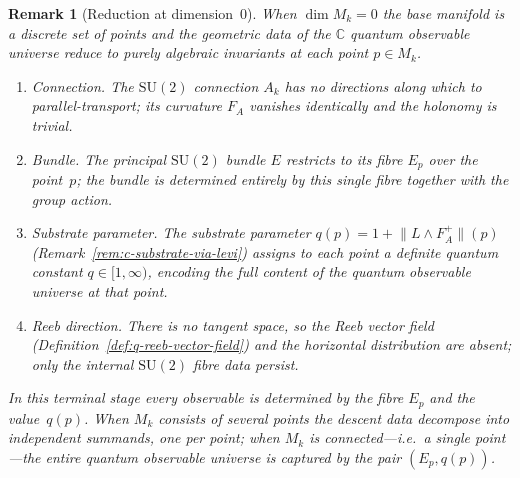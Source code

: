 \documentclass[12pt,a4paper]{report}
\newtheorem{remark}[theorem]{Remark}
\begin{document}
\begin{remark}[Reduction at dimension~$0$]
\label{rem:descent-reduction-zero}
When $\dim M_k = 0$ the base manifold is a discrete set of points and
the geometric data of the $\mathbb{C}$ quantum observable universe
reduce to purely algebraic invariants at each point $p\in M_k$.
\begin{enumerate}
  \item \emph{Connection.}  The $\mathrm{SU}(2)$ connection $A_k$ has no
        directions along which to parallel-transport; its curvature
        $F_A$ vanishes identically and the holonomy is trivial.
  \item \emph{Bundle.}  The principal $\mathrm{SU}(2)$ bundle $E$
        restricts to its fibre $E_p$ over the point~$p$; the bundle
        is determined entirely by this single fibre together with
        the group action.
  \item \emph{Substrate parameter.}  The substrate parameter
        $q(p) = 1 + \lVert L\wedge F_A^{+}\rVert(p)$
        (Remark~\ref{rem:c-substrate-via-levi}) assigns to each point a
        definite quantum constant $q\in[1,\infty)$, encoding the full
        content of the quantum observable universe at that point.
  \item \emph{Reeb direction.}  There is no tangent space, so the Reeb
        vector field (Definition~\ref{def:q-reeb-vector-field}) and the
        horizontal distribution are absent; only the internal
        $\mathrm{SU}(2)$ fibre data persist.
\end{enumerate}
In this terminal stage every observable is determined by the fibre
$E_p$ and the value~$q(p)$.  When $M_k$ consists of several points the
descent data decompose into independent summands, one per point; when
$M_k$ is connected---i.e.\ a single point---the entire quantum
observable universe is captured by the pair $(E_p, q(p))$.
\end{remark}
\end{document}
